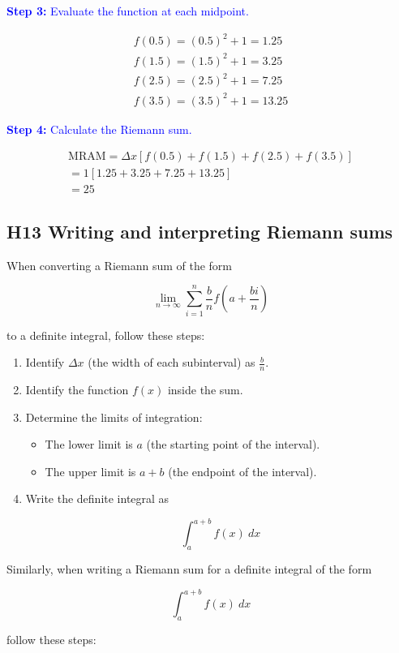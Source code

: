\documentclass[letterpaper, 12pt]{article}
\newcommand{\step}[2]{\textcolor{blue}{\textbf{Step #1:} #2}}
\begin{document}
\step{3}{Evaluate the function at each midpoint.}

\begin{gather*}
f(0.5) = (0.5)^2 + 1 = 1.25 \\
f(1.5) = (1.5)^2 + 1 = 3.25 \\
f(2.5) = (2.5)^2 + 1 = 7.25 \\
f(3.5) = (3.5)^2 + 1 = 13.25
\end{gather*}

\step{4}{Calculate the Riemann sum.}

\begin{gather*}
\text{MRAM} = \Delta x [f(0.5) + f(1.5) + f(2.5) + f(3.5)] \\
= 1 [1.25 + 3.25 + 7.25 + 13.25] \\
= \boxed{25}
\end{gather*}

\subsection*{H13 Writing and interpreting Riemann sums}

When converting a Riemann sum of the form

$$\lim_{n \to \infty} \sum_{i=1}^{n} \frac{b}{n} f\left(a + \frac{bi}{n}\right)$$

to a definite integral, follow these steps:

\begin{enumerate}
\item Identify $\Delta x$ (the width of each subinterval) as $\frac{b}{n}$.
\item Identify the function $f(x)$ inside the sum.
\item Determine the limits of integration:
    \begin{itemize}
    \item The lower limit is $a$ (the starting point of the interval).
    \item The upper limit is $a + b$ (the endpoint of the interval).
    \end{itemize}
\item Write the definite integral as

$$\int_{a}^{a+b} f(x) \: dx$$
\end{enumerate}

Similarly, when writing a Riemann sum for a definite integral of the form

$$\int_{a}^{a+b} f(x) \: dx$$

follow these steps:
\end{document}

